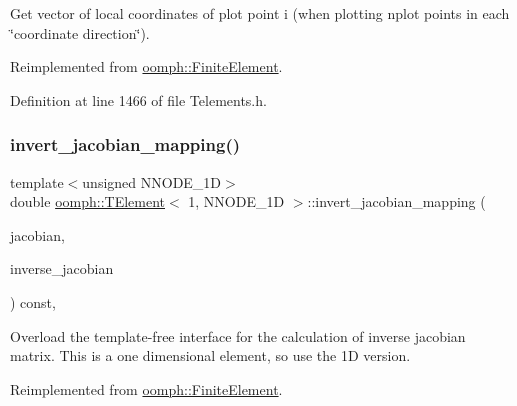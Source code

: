 Get vector of local coordinates of plot point i (when plotting nplot points in each \char`\"{}coordinate direction\char`\"{}). 



Reimplemented from \hyperlink{classoomph_1_1FiniteElement_a82da844fd3ebb2005842464cdc148a03}{oomph\+::\+Finite\+Element}.



Definition at line 1466 of file Telements.\+h.

\mbox{\label{classoomph_1_1TElement_3_011_00_01NNODE__1D_01_4_a9b258cbb903c83eb12054edd6cc3fa92}} 
\subsubsection{\texorpdfstring{invert\+\_\+jacobian\+\_\+mapping()}{invert\_jacobian\_mapping()}}
{\footnotesize\ttfamily template$<$unsigned N\+N\+O\+D\+E\+\_\+1D$>$ \\
double \hyperlink{classoomph_1_1TElement}{oomph\+::\+T\+Element}$<$ 1, N\+N\+O\+D\+E\+\_\+1D $>$\+::invert\+\_\+jacobian\+\_\+mapping (\begin{DoxyParamCaption}\item[{const \hyperlink{classoomph_1_1DenseMatrix}{Dense\+Matrix}$<$ double $>$ \&}]{jacobian,  }\item[{\hyperlink{classoomph_1_1DenseMatrix}{Dense\+Matrix}$<$ double $>$ \&}]{inverse\+\_\+jacobian }\end{DoxyParamCaption}) const\hspace{0.3cm}{\ttfamily [inline]}, {\ttfamily [virtual]}}



Overload the template-\/free interface for the calculation of inverse jacobian matrix. This is a one dimensional element, so use the 1D version. 



Reimplemented from \hyperlink{classoomph_1_1FiniteElement_a42c86a7628fee00d3a9d35b935b29e48}{oomph\+::\+Finite\+Element}.



